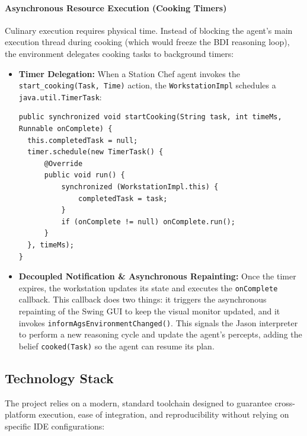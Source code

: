 \documentclass{scrartcl}
\begin{document}
\paragraph{Asynchronous Resource Execution (Cooking Timers)}
Culinary execution requires physical time. Instead of blocking the agent's main execution thread during cooking (which would freeze the BDI reasoning loop), the environment delegates cooking tasks to background timers:

\begin{itemize}
\item \textbf{Timer Delegation:} When a Station Chef agent invokes the \texttt{start\_cooking(Task, Time)} action, the \texttt{WorkstationImpl} schedules a \texttt{java.util.TimerTask}:
\begin{lstlisting}[basicstyle=\footnotesize\ttfamily, breaklines=true]
public synchronized void startCooking(String task, int timeMs, Runnable onComplete) {
  this.completedTask = null;
  timer.schedule(new TimerTask() {
      @Override
      public void run() {
          synchronized (WorkstationImpl.this) {
              completedTask = task;
          }
          if (onComplete != null) onComplete.run();
      }
  }, timeMs);
}
\end{lstlisting}

\item \textbf{Decoupled Notification \& Asynchronous Repainting:} Once the timer expires, the workstation updates its state and executes the \texttt{onComplete} callback. This callback does two things: it triggers the asynchronous repainting of the Swing GUI to keep the visual monitor updated, and it invokes \texttt{informAgsEnvironmentChanged()}. This signals the Jason interpreter to perform a new reasoning cycle and update the agent's percepts, adding the belief \texttt{cooked(Task)} so the agent can resume its plan.
\end{itemize}


\subsection{Technology Stack}

The project relies on a modern, standard toolchain designed to guarantee cross-platform execution, ease of integration, and reproducibility without relying on specific IDE configurations:
\end{document}
